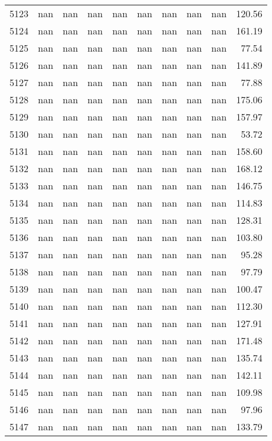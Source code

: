 \begin{tabular}{lrrrrrrrrr}
5123 & nan & nan & nan & nan & nan & nan & nan & nan & 120.56 \\
5124 & nan & nan & nan & nan & nan & nan & nan & nan & 161.19 \\
5125 & nan & nan & nan & nan & nan & nan & nan & nan & 77.54 \\
5126 & nan & nan & nan & nan & nan & nan & nan & nan & 141.89 \\
5127 & nan & nan & nan & nan & nan & nan & nan & nan & 77.88 \\
5128 & nan & nan & nan & nan & nan & nan & nan & nan & 175.06 \\
5129 & nan & nan & nan & nan & nan & nan & nan & nan & 157.97 \\
5130 & nan & nan & nan & nan & nan & nan & nan & nan & 53.72 \\
5131 & nan & nan & nan & nan & nan & nan & nan & nan & 158.60 \\
5132 & nan & nan & nan & nan & nan & nan & nan & nan & 168.12 \\
5133 & nan & nan & nan & nan & nan & nan & nan & nan & 146.75 \\
5134 & nan & nan & nan & nan & nan & nan & nan & nan & 114.83 \\
5135 & nan & nan & nan & nan & nan & nan & nan & nan & 128.31 \\
5136 & nan & nan & nan & nan & nan & nan & nan & nan & 103.80 \\
5137 & nan & nan & nan & nan & nan & nan & nan & nan & 95.28 \\
5138 & nan & nan & nan & nan & nan & nan & nan & nan & 97.79 \\
5139 & nan & nan & nan & nan & nan & nan & nan & nan & 100.47 \\
5140 & nan & nan & nan & nan & nan & nan & nan & nan & 112.30 \\
5141 & nan & nan & nan & nan & nan & nan & nan & nan & 127.91 \\
5142 & nan & nan & nan & nan & nan & nan & nan & nan & 171.48 \\
5143 & nan & nan & nan & nan & nan & nan & nan & nan & 135.74 \\
5144 & nan & nan & nan & nan & nan & nan & nan & nan & 142.11 \\
5145 & nan & nan & nan & nan & nan & nan & nan & nan & 109.98 \\
5146 & nan & nan & nan & nan & nan & nan & nan & nan & 97.96 \\
5147 & nan & nan & nan & nan & nan & nan & nan & nan & 133.79 \\

\end{tabular}
